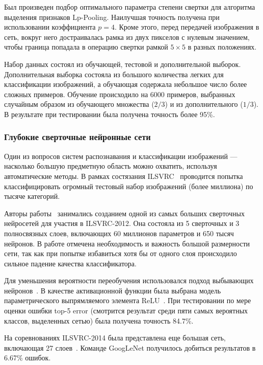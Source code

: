 \documentclass[a4paper,14pt]{extarticle} %
\begin{document}
Был произведен подбор оптимального параметра степени свертки для алгоритма выделения признаков Lp-Pooling. Наилучшая точность получена при использовании коэффициента $p=4$. Кроме этого, перед передачей изображения в сеть, вокруг него достраивалась рамка из двух пикселов с нулевым значением, чтобы граница попадала в операцию свертки рамкой $5 \times 5$ в разных положениях.

Набор данных состоял из обучающей, тестовой и дополнительной выборок. Дополнительная выборка состояла из большого количества легких для классификации изображений, а обучающая содержала небольшое число более сложных примеров. Обучение происходило на 6000 примеров, выбранных случайным образом из обучающего множества ($2/3$) и из дополнительного ($1/3$). В результате при тестировании была получена точность более 95\%.

\subsubsection{Глубокие сверточные нейронные сети} \label{DeepCNN}
\hspace{\parindent} Один из вопросов систем распознавания и классификации изображений --- насколько большую предметную область можно охватить, используя автоматические методы. В рамках состязания ILSVRC~\cite{ILSVRC} проводится попытка классифицировать огромный тестовый набор изображений (более миллиона) по тысяче категорий.

Авторы работы~\cite{krizhevsky2012imagenet} занимались созданием одной из самых больших сверточных нейросетей для участия в ILSVRC-2012. Она состояла из 5 сверточных и 3 полносвязных слоев, включающих 60 миллионов параметров и 650 тысяч нейронов. В работе отмечена необходимость и важность большой размерности сети, так как при попытке избавиться хотя бы от одного слоя происходило сильное падение качества классификатора. 

Для уменьшения вероятности переобучения использовался подход выбывающих нейронов~\cite{srivastava2014dropout}. В качестве активационной функции была выбрана модель параметрического выпрямляемого элемента ReLU~\cite{dahl2013improving}. При тестировании по мере оценки ошибки top-5 error (смотрится результат среди пяти самых вероятных классов, выделенных сетью) была получена точность 84.7\%.

На соревнованиях ILSVRC-2014 была представлена еще большая сеть, включающая 27 слоев~\cite{szegedy2014going}. Команде GoogLeNet получилось добиться результатов в 6.67\% ошибок.
\end{document}
